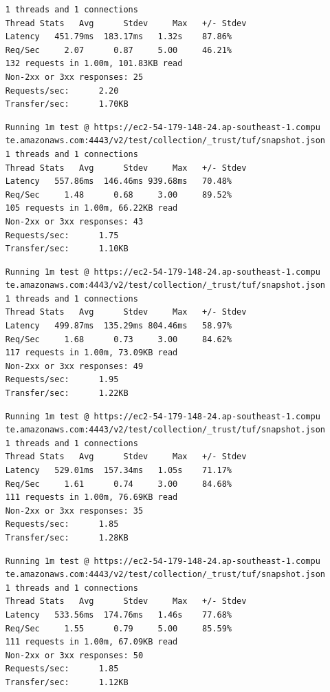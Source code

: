 \documentclass[a4paper,12pt]{article}
\newcounter{subsubsubsection}[subsubsection]
\begin{document}
{{\begin{verbatim}
	1 threads and 1 connections
	Thread Stats   Avg      Stdev     Max   +/- Stdev
	Latency   451.79ms  183.17ms   1.32s    87.86%
	Req/Sec     2.07      0.87     5.00     46.21%
	132 requests in 1.00m, 101.83KB read
	Non-2xx or 3xx responses: 25
	Requests/sec:      2.20
	Transfer/sec:      1.70KB
	\end{verbatim}
	\newpage
	\begin{verbatim}
	Running 1m test @ https://ec2-54-179-148-24.ap-southeast-1.compu
	te.amazonaws.com:4443/v2/test/collection/_trust/tuf/snapshot.json
	1 threads and 1 connections
	Thread Stats   Avg      Stdev     Max   +/- Stdev
	Latency   557.86ms  146.46ms 939.68ms   70.48%
	Req/Sec     1.48      0.68     3.00     89.52%
	105 requests in 1.00m, 66.22KB read
	Non-2xx or 3xx responses: 43
	Requests/sec:      1.75
	Transfer/sec:      1.10KB
	\end{verbatim}
	\begin{verbatim}
	Running 1m test @ https://ec2-54-179-148-24.ap-southeast-1.compu
	te.amazonaws.com:4443/v2/test/collection/_trust/tuf/snapshot.json
	1 threads and 1 connections
	Thread Stats   Avg      Stdev     Max   +/- Stdev
	Latency   499.87ms  135.29ms 804.46ms   58.97%
	Req/Sec     1.68      0.73     3.00     84.62%
	117 requests in 1.00m, 73.09KB read
	Non-2xx or 3xx responses: 49
	Requests/sec:      1.95
	Transfer/sec:      1.22KB
	\end{verbatim}
	\begin{verbatim}
	Running 1m test @ https://ec2-54-179-148-24.ap-southeast-1.compu
	te.amazonaws.com:4443/v2/test/collection/_trust/tuf/snapshot.json
	1 threads and 1 connections
	Thread Stats   Avg      Stdev     Max   +/- Stdev
	Latency   529.01ms  157.34ms   1.05s    71.17%
	Req/Sec     1.61      0.74     3.00     84.68%
	111 requests in 1.00m, 76.69KB read
	Non-2xx or 3xx responses: 35
	Requests/sec:      1.85
	Transfer/sec:      1.28KB
	\end{verbatim}
	\begin{verbatim}
	Running 1m test @ https://ec2-54-179-148-24.ap-southeast-1.compu
	te.amazonaws.com:4443/v2/test/collection/_trust/tuf/snapshot.json
	1 threads and 1 connections
	Thread Stats   Avg      Stdev     Max   +/- Stdev
	Latency   533.56ms  174.76ms   1.46s    77.68%
	Req/Sec     1.55      0.79     5.00     85.59%
	111 requests in 1.00m, 67.09KB read
	Non-2xx or 3xx responses: 50
	Requests/sec:      1.85
	Transfer/sec:      1.12KB
	\end{verbatim}
	\begin{verbatim}

\end{verbatim}}}
\end{document}
